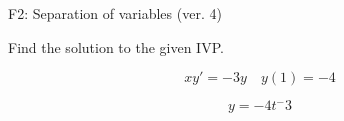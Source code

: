 \begin{exercise}
  \begin{exerciseTitle}F2: Separation of variables (ver. 4)\end{exerciseTitle}
  \begin{exerciseStatement}
    
Find the solution to the given IVP.

    
\[xy'= -3 y \hspace{1em} y( 1 ) = -4\]

  \end{exerciseStatement}
  \begin{exerciseAnswer}
    
\[y= -4 t^ -3\]

  \end{exerciseAnswer}
\end{exercise}